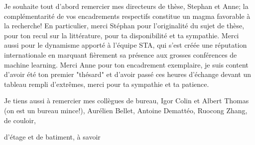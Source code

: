 \begin{acknowledgements}
  Je souhaite tout d'abord remercier mes directeurs de thèse, Stephan et Anne; la complémentarité de vos encadrements respectifs constitue un magma favorable à la recherche! En particulier, merci Stéphan pour l'originalité du sujet de thèse, pour ton recul sur la littérature, pour ta disponibilité et ta sympathie. Merci aussi pour le dynamisme apporté à l'équipe STA, qui s'est créée une réputation internationale en marquant fièrement sa présence aux grosses conférences de machine learning. Merci Anne pour ton encadrement exemplaire, je suis content d'avoir été ton premier "thésard" et d'avoir passé ces heures d'échange devant un tableau rempli d'extrêmes, merci pour ta sympathie et ta patience.

Je tiens aussi à remercier mes collègues 
de bureau, Igor Colin et Albert Thomas (on est un bureau mince!), Aurélien Bellet, Antoine Demattéo, Ruocong Zhang, 
de couloir, 

 d'étage et de batiment, à savoir 

\end{acknowledgements}

